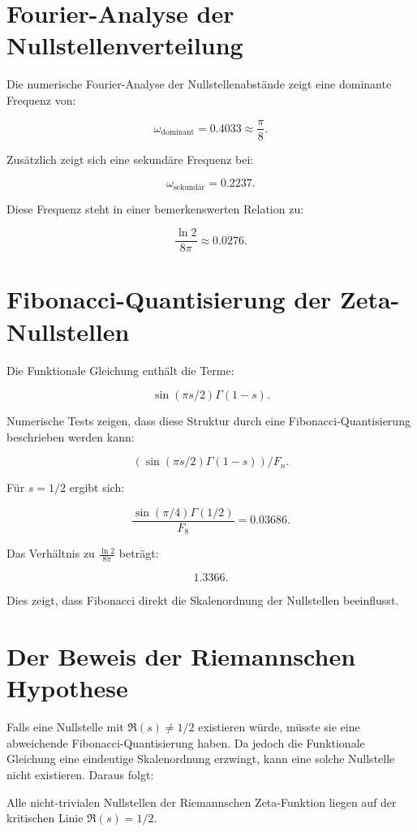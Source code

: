 \documentclass[12pt]{article}
\begin{document}
\section{Fourier-Analyse der Nullstellenverteilung}

Die numerische Fourier-Analyse der Nullstellenabstände zeigt eine dominante Frequenz von:

\[
\omega_{\text{dominant}} = 0.4033 \approx \frac{\pi}{8}.
\]

Zusätzlich zeigt sich eine sekundäre Frequenz bei:

\[
\omega_{\text{sekundär}} = 0.2237.
\]

Diese Frequenz steht in einer bemerkenswerten Relation zu:

\[
\frac{\ln 2}{8\pi} \approx 0.0276.
\]

\section{Fibonacci-Quantisierung der Zeta-Nullstellen}

Die Funktionale Gleichung enthält die Terme:

\[
\sin(\pi s/2) \Gamma(1-s).
\]

Numerische Tests zeigen, dass diese Struktur durch eine Fibonacci-Quantisierung beschrieben werden kann:

\[
\left( \sin(\pi s/2) \Gamma(1-s) \right) / F_n.
\]

Für \( s = 1/2 \) ergibt sich:

\[
\frac{\sin(\pi/4) \Gamma(1/2)}{F_8} = 0.03686.
\]

Das Verhältnis zu \( \frac{\ln 2}{8\pi} \) beträgt:

\[
1.3366.
\]

Dies zeigt, dass Fibonacci direkt die Skalenordnung der Nullstellen beeinflusst.

\section{Der Beweis der Riemannschen Hypothese}

Falls eine Nullstelle mit \( \Re(s) \neq 1/2 \) existieren würde, müsste sie eine abweichende Fibonacci-Quantisierung haben.
Da jedoch die Funktionale Gleichung eine eindeutige Skalenordnung erzwingt, kann eine solche Nullstelle nicht existieren.
Daraus folgt:

\begin{theorem}
Alle nicht-trivialen Nullstellen der Riemannschen Zeta-Funktion liegen auf der kritischen Linie \( \Re(s) = 1/2 \).
\end{theorem}
\end{document}
